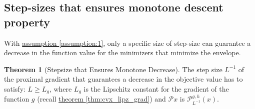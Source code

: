 \documentclass[]{article}
\theoremstyle{definition}
\newtheorem{theorem}{Theorem}       %
\begin{document}
    \subsection{Step-sizes that ensures monotone descent property}
        With \hyperref[assumption:1]{assumption \ref*{assumption:1}}, only a specific size of step-size can guarantee a decrease in the function value for the minimizers that minimize the envelope. 
        \begin{theorem}[Stepsize that Ensures Monotone Decrease]\label{thm:monotone_decrease}
            The step size $L^{-1}$ of the proximal gradient that guarantees a decrease in the objective value has to satisfy: $L \ge L_g$, where $L_g$ is the Lipschitz constant for the gradient of the function $g$ (recall \hyperref[thm:cvx_lipz_grad]{theorem \ref*{thm:cvx_lipz_grad}}) and $\mathcal Px$ is $\mathcal P_{L^{-1}}^{g, h}(x)$. 
        \end{theorem}
\end{document}
